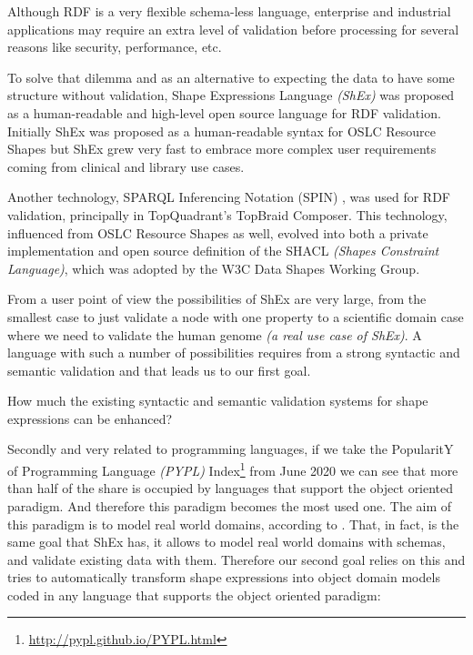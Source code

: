 Although RDF is a very flexible schema-less language, enterprise and industrial applications may require an extra level of
validation before processing for several reasons like security, performance, etc.

To solve that dilemma and as an alternative to expecting the data to have some structure without validation, Shape Expressions Language
\textit{(ShEx)} was proposed as a human-readable and high-level open source language for RDF validation. Initially ShEx was proposed
as a human-readable syntax for OSLC Resource Shapes \cite{oslc-resource-shape} but ShEx grew very fast to embrace more
complex user requirements coming from clinical and library use cases.

Another technology, SPARQL Inferencing Notation (SPIN) \cite{knublauch2011spin}, was used for RDF validation, principally in TopQuadrant’s TopBraid Composer. This technology, influenced
from OSLC Resource Shapes as well, evolved into both a private implementation and open source definition of the SHACL
\textit{(Shapes Constraint Language)}, which was adopted by the W3C Data Shapes Working Group.

From a user point of view the possibilities of ShEx are very large, from the smallest case to just validate a node with one property
to a scientific domain case where we need to validate the human genome \textit{(a real use case of ShEx)}. A language with such a number
of possibilities requires from a strong syntactic and semantic validation and that leads us to our first goal.

\begin{researchquestion}
  How much the existing syntactic and semantic validation systems for shape expressions can be enhanced?
\end{researchquestion}

Secondly and very related to programming languages, if we take the PopularitY of Programming Language \textit{(PYPL)} Index\footnote{\url{http://pypl.github.io/PYPL.html}}
from June 2020 we can see that more than half of the share is occupied by languages that support the object oriented paradigm. And therefore this paradigm
becomes the most used one. The aim of this paradigm is to model real world domains, according to \cite{wegner1990concepts}. That, in fact, is the same goal
that ShEx has, it allows to model real world domains with schemas, and validate existing data with them. Therefore our second goal relies on this and tries
to automatically transform shape expressions into object domain models coded in any language that supports the object oriented paradigm:

